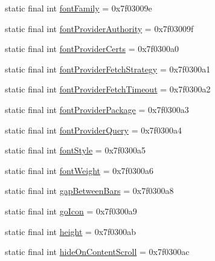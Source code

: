 \begin{DoxyCompactItemize}
\item 
static final int \mbox{\hyperlink{classandroid_1_1support_1_1v7_1_1appcompat_1_1R_1_1attr_a23ba4ab31bcc6fba9c333a422f32225f}{font\+Family}} = 0x7f03009e
\item 
static final int \mbox{\hyperlink{classandroid_1_1support_1_1v7_1_1appcompat_1_1R_1_1attr_a6d9eab813186f61e2ab0fb992a1de67c}{font\+Provider\+Authority}} = 0x7f03009f
\item 
static final int \mbox{\hyperlink{classandroid_1_1support_1_1v7_1_1appcompat_1_1R_1_1attr_a8896916d3b03e9285f748bbe64d43273}{font\+Provider\+Certs}} = 0x7f0300a0
\item 
static final int \mbox{\hyperlink{classandroid_1_1support_1_1v7_1_1appcompat_1_1R_1_1attr_a1e7762850bad8d88a305007c33b586f6}{font\+Provider\+Fetch\+Strategy}} = 0x7f0300a1
\item 
static final int \mbox{\hyperlink{classandroid_1_1support_1_1v7_1_1appcompat_1_1R_1_1attr_ae21b6976cce755ba80181256b88870c9}{font\+Provider\+Fetch\+Timeout}} = 0x7f0300a2
\item 
static final int \mbox{\hyperlink{classandroid_1_1support_1_1v7_1_1appcompat_1_1R_1_1attr_a37cf5bedfb875a1f08ee163cc7a02f78}{font\+Provider\+Package}} = 0x7f0300a3
\item 
static final int \mbox{\hyperlink{classandroid_1_1support_1_1v7_1_1appcompat_1_1R_1_1attr_a12072243f55422a8b0f28aba4b37c91f}{font\+Provider\+Query}} = 0x7f0300a4
\item 
static final int \mbox{\hyperlink{classandroid_1_1support_1_1v7_1_1appcompat_1_1R_1_1attr_a5cd9d3802faace589facf6430a60d61f}{font\+Style}} = 0x7f0300a5
\item 
static final int \mbox{\hyperlink{classandroid_1_1support_1_1v7_1_1appcompat_1_1R_1_1attr_a39b82d4183c0aee73623493a08ab0dd0}{font\+Weight}} = 0x7f0300a6
\item 
static final int \mbox{\hyperlink{classandroid_1_1support_1_1v7_1_1appcompat_1_1R_1_1attr_a37cf66ba61ecfae3c1d28ee79d9ef459}{gap\+Between\+Bars}} = 0x7f0300a8
\item 
static final int \mbox{\hyperlink{classandroid_1_1support_1_1v7_1_1appcompat_1_1R_1_1attr_a817028431fb50ad70b0761d4813ee1dd}{go\+Icon}} = 0x7f0300a9
\item 
static final int \mbox{\hyperlink{classandroid_1_1support_1_1v7_1_1appcompat_1_1R_1_1attr_ae2766034f35dee610b4cf8dbff1ce762}{height}} = 0x7f0300ab
\item 
static final int \mbox{\hyperlink{classandroid_1_1support_1_1v7_1_1appcompat_1_1R_1_1attr_af0d56ba3b5798b633d10f4b184f4d98f}{hide\+On\+Content\+Scroll}} = 0x7f0300ac

\end{DoxyCompactItemize}
